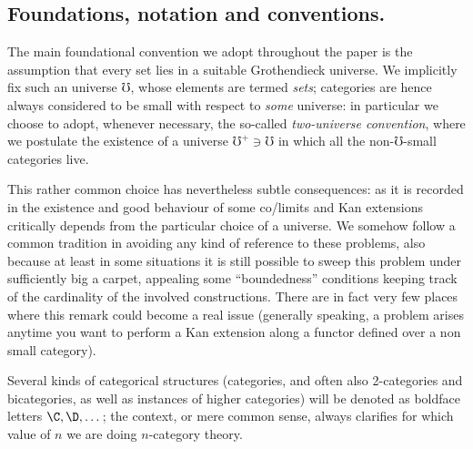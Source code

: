 
\subsection*{Foundations, notation and conventions.} The main foundational convention we adopt throughout the paper is the assumption \cite{artin1972sga} that every set lies in a suitable Grothendieck universe. We implicitly fix such an universe $\mho$, whose elements are termed \emph{sets}; categories are hence always considered to be small with respect to \emph{some} universe: in particular we choose to adopt, whenever necessary, the so\hyp{}called \emph{two\hyp{}universe convention}, where we postulate the existence of a universe $\mho^+\ni \mho$ in which all the non-$\mho$\hyp{}small categories live. 

This rather common choice has nevertheless subtle consequences: as it is recorded in \cite{MR0396578,low2013universes} the existence and good behaviour of some co/limits and Kan extensions critically depends from the particular choice of a universe. We somehow follow a common tradition in avoiding any kind of reference to these problems, also because at least in some situations it is still possible to sweep this problem under sufficiently big a carpet, appealing some ``boundedness'' conditions keeping track of the cardinality of the involved constructions. There are in fact very few places where this remark could become a real issue (generally speaking, a problem arises anytime you want to perform a Kan extension along a functor defined over a non small category).

Several kinds of categorical structures (categories, and often also 2\hyp{}categories and bicategories, as well as instances of higher categories) will be denoted as boldface letters $\C,\D,\dots$; the context, or mere common sense, always clarifies for which value of $n$ we are doing $n$\hyp{}category theory. 

